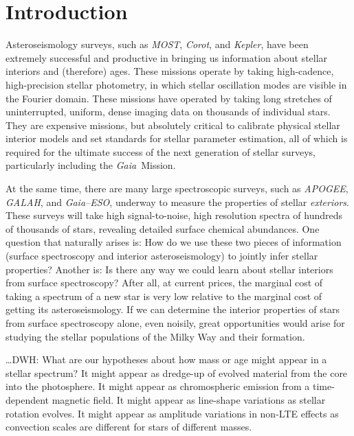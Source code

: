 \documentclass[12pt, preprint]{aastex}
\newcommand{\project}[1]{\textsl{#1}}
\newcommand{\apogee}{\project{APOGEE}}
\newcommand{\corot}{\project{Corot}}
\newcommand{\kepler}{\project{Kepler}}
\newcommand{\gaia}{\project{Gaia}}
\newcommand{\gaiaeso}{\project{Gaia--ESO}}
\newcommand{\galah}{\project{GALAH}}
\newcommand{\most}{\project{MOST}}
\begin{document}

\section{Introduction}\label{sec:Intro}

Asteroseismology surveys, such as \most, \corot, and \kepler, have
been extremely successful and productive in bringing us information
about stellar interiors and (therefore) ages.
These missions operate by taking high-cadence, high-precision stellar
photometry, in which stellar oscillation modes are visible in the
Fourier domain.
These missions have operated by taking long stretches of
uninterrupted, uniform, dense imaging data on thousands of individual
stars.
They are expensive missions, but absolutely critical to calibrate
physical stellar interior models and set standards for stellar
parameter estimation, all of which is required for the ultimate
success of the next generation of stellar surveys, particularly
including the \gaia\ Mission.

At the same time, there are many large spectroscopic surveys, such
as \apogee, \galah, and \gaiaeso, underway to measure the properties
of stellar \emph{exteriors}.
These surveys will take high signal-to-noise, high resolution spectra
of hundreds of thousands of stars, revealing detailed surface chemical
abundances.
One question that naturally arises is:
How do we use these two pieces of information (surface spectroscopy
and interior asteroseismology) to jointly infer stellar properties?
Another is:
Is there any way we could learn about stellar interiors from surface
spectroscopy?
After all, at current prices, the marginal cost of taking a spectrum of
a new star is very low relative to the marginal cost of getting its
asteroseismology.
If we can determine the interior properties of stars from surface
spectroscopy alone, even noisily, great opportunities would arise for
studying the stellar populations of the Milky Way and their formation.

\ldots DWH: What are our hypotheses about how mass or age might appear
in a stellar spectrum?  It might appear as dredge-up of evolved
material from the core into the photosphere.  It might appear as
chromospheric emission from a time-dependent magnetic field.  It might
appear as line-shape variations as stellar rotation evolves.  It might
appear as amplitude variations in non-LTE effects as convection scales
are different for stars of different masses.
\end{document}
